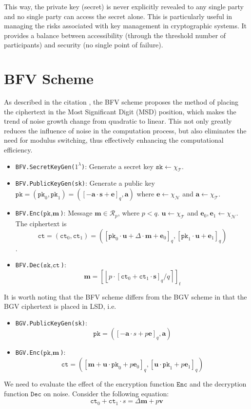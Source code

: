 \documentclass[11pt]{article}
\begin{document}
This way, the private key (secret) is never explicitly revealed to any single party and no single party can access the secret alone. This is particularly useful in managing the risks associated with key management in cryptographic systems. It provides a balance between accessibility (through the threshold number of participants) and security (no single point of failure).
\section{BFV Scheme}
As described in the citation \cite{10.1007/978-3-642-32009-5_50, cryptoeprint:2012/144}, the BFV scheme proposes the method of placing the ciphertext in the Most Significant Digit (MSD) position, which makes the trend of noise growth change from quadratic to linear. This not only greatly reduces the influence of noise in the computation process, but also eliminates the need for modulus switching, thus effectively enhancing the computational efficiency.

\begin{itemize}
	\item \texttt{BFV.SecretKeyGen($1^\lambda$)}: Generate a secret key $\texttt{sk}\leftarrow \chi_\mathcal{T}$.
	\item \texttt{BFV.PublicKeyGen(\texttt{sk})}: Generate a public key $\texttt{pk} =(\texttt{pk}_0,\texttt{pk}_1)= \left([-\mathbf{a}\cdot\mathbf{s}+\mathbf{e}]_{q}, \mathbf{a}\right)$ where $\mathbf{e}\leftarrow \chi_\mathcal{N}$ and $\mathbf{a}\leftarrow \chi_\mathcal{T}$.
	\item \texttt{BFV.Enc($\texttt{pk},\textbf{m}$)}: Message $\mathbf{m}\in \mathcal{R}_p$, where $p<q$. $\mathbf{u}\leftarrow \chi_\mathcal{T}$ and $\mathbf{e}_0, \mathbf{e}_1\leftarrow \chi_\mathcal{N}$. The ciphertext is $$\texttt{ct} = (\texttt{ct}_0,\texttt{ct}_1)=\left([\texttt{pk}_0\cdot\mathbf{u}+\Delta\cdot\mathbf{m}+\mathbf{e}_0]_{q},[\texttt{pk}_1\cdot\mathbf{u}+\mathbf{e}_1]_{q}\right)$$.
	\item \texttt{BFV.Dec($\texttt{sk},\texttt{ct}$)}: $$\mathbf{m}=\left[\left\lfloor p\cdot[\texttt{ct}_0+\texttt{ct}_1\cdot\mathbf{s}]_q/q\right\rceil\right]_t$$
\end{itemize}
It is worth noting that the BFV scheme differs from the BGV scheme in that the BGV ciphertext is placed in LSD, i.e.
\begin{itemize}
	\item \texttt{BGV.PublicKeyGen(\texttt{sk})}: $$\texttt{pk}=([-\mathbf{a}\cdot{s}+p\mathbf{e}]_q, \mathbf{a})$$
	\item \texttt{BGV.Enc($\texttt{pk},\textbf{m}$)}: $$\texttt{ct}=([ \mathbf{m}+\mathbf{u}\cdot\texttt{pk}_0+p\mathbf{e}_0]_q,[\mathbf{u}\cdot\texttt{pk}_1+p\mathbf{e}_1]_q)$$
\end{itemize}
We need to evaluate the effect of the encryption function $\texttt{Enc}$ and the decryption function $\texttt{Dec}$ on noise. Consider the following equation:
\begin{equation}
	\texttt{ct}_0+\texttt{ct}_1\cdot{s}=\Delta\mathbf{m}+p\mathbf{v}
\end{equation}
\end{document}
